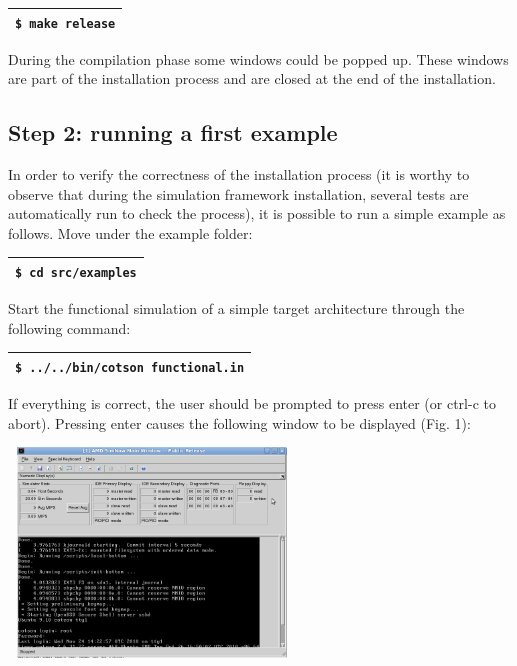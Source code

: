 \documentclass[a4paper]{article}
\begin{document}
\begin{flushleft}
\tablehead{}
\begin{supertabular}{|m{6.29346in}|}
\hline
{} \texttt{\$ }\texttt{make release}\\\hline
\end{supertabular}
\end{flushleft}
{
During the compilation phase some windows could be popped up. These
windows are part of the installation process and are closed at the end
of the installation.}

\subsection[Step 2: running a first
example]{\foreignlanguage{english}{Step 2: r}unning a first example}
\label{bkm:Ref388173300}\label{bkm:Ref388173277}{
In order to verify the correctness of the installation process (it is
worthy to observe that during the simulation framework installation,
several tests are automatically run to check the process), it is
possible to run a simple example as follows. Move under the example
folder:}

\begin{flushleft}
\tablehead{}
\begin{supertabular}{|m{6.29346in}|}
\hline
{} \texttt{\$ cd
}\foreignlanguage{english}{\texttt{src/examples}}\\\hline
\end{supertabular}
\end{flushleft}
{
Start the functional simulation of a simple target architecture through
the following command:}

\begin{flushleft}
\tablehead{}
\begin{supertabular}{|m{6.29346in}|}
\hline
{} \texttt{\$ ../../bin/cotson
functional.in}\\\hline
\end{supertabular}
\end{flushleft}
{
If everything is correct, the user should be prompted to press enter (or
ctrl-c to abort). Pressing enter causes the following window to be
displayed (Fig. 1): }

{\centering 
\includegraphics[width=3.0in,height=2.2in]{img1.png}
\par}
\end{document}
